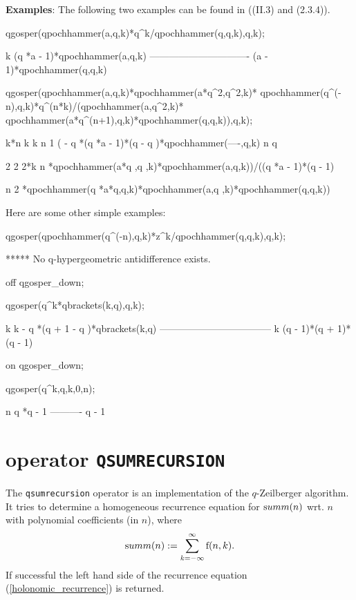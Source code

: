 {\bf Examples}: The following two examples can be found in 
	\cite{GasperRahman} ((II.3) and (2.3.4)).

\begin{redoutput}
\redprompt qgosper(qpochhammer(a,q,k)*q^k/qpochhammer(q,q,k),q,k);

   k
 (q *a - 1)*qpochhammer(a,q,k)
-------------------------------
  (a - 1)*qpochhammer(q,q,k)

\redprompt qgosper(qpochhammer(a,q,k)*qpochhammer(a*q^2,q^2,k)*
   qpochhammer(q^(-n),q,k)*q^(n*k)/(qpochhammer(a,q^2,k)*
   qpochhammer(a*q^(n+1),q,k)*qpochhammer(q,q,k)),q,k);

     k*n   k          k    n               1
( - q   *(q *a - 1)*(q  - q )*qpochhammer(----,q,k)
                                            n
                                           q

                 2  2                           2*k          n
 *qpochhammer(a*q ,q ,k)*qpochhammer(a,q,k))/((q   *a - 1)*(q  - 1)

               n                         2
 *qpochhammer(q *a*q,q,k)*qpochhammer(a,q ,k)*qpochhammer(q,q,k))
\end{redoutput}

Here are some other simple examples:
\begin{redoutput}
\redprompt qgosper(qpochhammer(q^(-n),q,k)*z^k/qpochhammer(q,q,k),q,k);

***** No q-hypergeometric antidifference exists. 

\redprompt off qgosper_down;

\redprompt qgosper(q^k*qbrackets(k,q),q,k);

     k           k
  - q *(q + 1 - q )*qbrackets(k,q)
-----------------------------------
       k
     (q  - 1)*(q + 1)*(q - 1)

\redprompt on qgosper_down;

\redprompt qgosper(q^k,q,k,0,n);

  n
 q *q - 1
----------
  q - 1
\end{redoutput}
\vspace{-2ex}%
%
\section{\REDUCE{} operator {\tt QSUMRECURSION}}
\label{reduce_qsumrecursion}

The {\tt qsumrecursion} operator is an implementation of the
$q$-Zeilberger algorithm.
It tries to determine a homogeneous recurrence equation for 
${\mathrm summ}(n)$ wrt. $n$ with polynomial coefficients (in $n$), where
%
\[
	{\mathrm summ}(n):= \sum_{k=-\infty}^{\infty}{{\mathrm f}(n,k)}.
\]
%
If successful the left hand side of the recurrence equation 
(\ref{holonomic_recurrence}) is returned.

